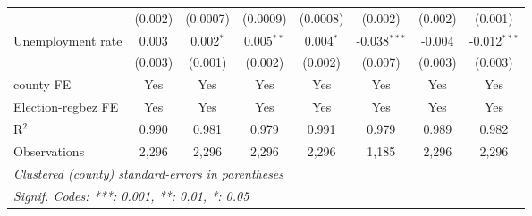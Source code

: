 \begin{table}[htbp]
\begin{tabular}{lccccccc}
                                                              & (0.002)              & (0.0007)              & (0.0009)              & (0.0008)       & (0.002)        & (0.002)        & (0.001)\\   
      Unemployment rate                                       & 0.003                & 0.002$^{*}$           & 0.005$^{**}$          & 0.004$^{*}$    & -0.038$^{***}$ & -0.004         & -0.012$^{***}$\\   
                                                              & (0.003)              & (0.001)               & (0.002)               & (0.002)        & (0.007)        & (0.003)        & (0.003)\\   
      county FE                                               & Yes                  & Yes                   & Yes                   & Yes            & Yes            & Yes            & Yes\\  
      Election-regbez FE                                      & Yes                  & Yes                   & Yes                   & Yes            & Yes            & Yes            & Yes\\  
      R$^2$                                                   & 0.990                & 0.981                 & 0.979                 & 0.991          & 0.979          & 0.989          & 0.982\\  
      Observations                                            & 2,296                & 2,296                 & 2,296                 & 2,296          & 1,185          & 2,296          & 2,296\\  
      \midrule \midrule
      \multicolumn{8}{l}{\emph{Clustered (county) standard-errors in parentheses}}\\
      \multicolumn{8}{l}{\emph{Signif. Codes: ***: 0.001, **: 0.01, *: 0.05}}\\
   \end{tabular}
\end{table}



